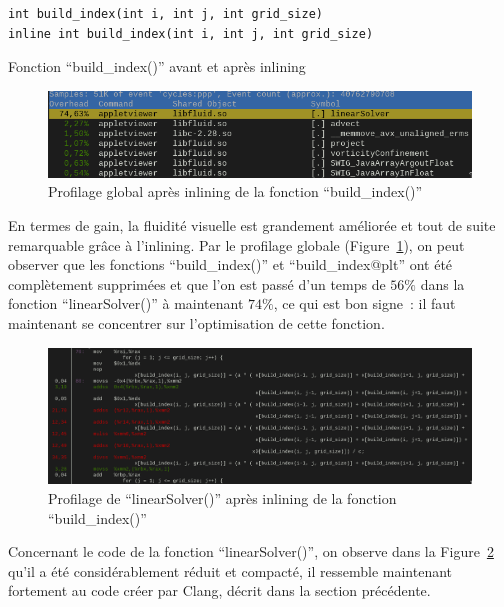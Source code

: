 \documentclass[12pt,a4paper]{article}
\begin{document}
\begin{listing}[h]
    \begin{verbatim}
int build_index(int i, int j, int grid_size)
inline int build_index(int i, int j, int grid_size)
    \end{verbatim}
    \caption{Fonction \enquote{build\_index()} avant et après inlining}
    \label{lst.optim.inlin}
\end{listing}

\begin{figure}
    \centering
    \includegraphics[scale=0.55]{figures/optims/inlining/global.png}
    \caption{Profilage global après inlining de la fonction \enquote{build\_index()}}
    \label{fig.optim.inlin.global}
\end{figure}

En termes de gain, la fluidité visuelle est grandement améliorée et tout de
suite remarquable grâce à l’inlining. Par le profilage globale
(Figure~\ref{fig.optim.inlin.global}), on peut observer que les fonctions
\enquote{build\_index()} et \enquote{build\_index@plt} ont été complètement
supprimées et que l’on est passé d’un temps de $56\%$ dans la fonction
\enquote{linearSolver()} à maintenant $74\%$, ce qui est bon signe : il faut
maintenant se concentrer sur l’optimisation de cette fonction.

\begin{figure}
    \centering
    \includegraphics[scale=0.37]{figures/optims/inlining/linearSolver.png}
    \caption{Profilage de \enquote{linearSolver()} après inlining de la fonction \enquote{build\_index()}}
    \label{fig.optim.inlin.linearSolver}
\end{figure}

Concernant le code de la fonction \enquote{linearSolver()}, on observe dans la
Figure~\ref{fig.optim.inlin.linearSolver} qu’il a été considérablement réduit et
compacté, il ressemble maintenant fortement au code créer par Clang, décrit
dans la section précédente.
\end{document}
